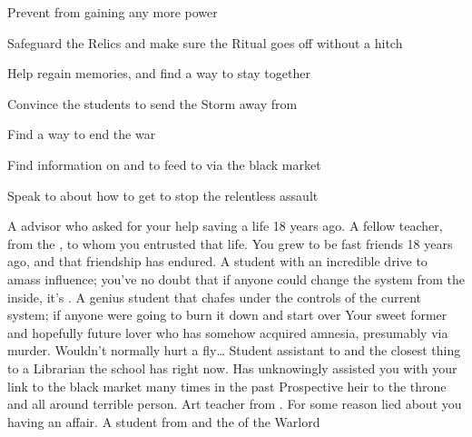 \documentclass[char]{GL2020}
\begin{document}
\begin{itemz}[Goals]
	\item Prevent \cPrince{} from gaining any more power
	\item Safeguard the Relics and make sure the Ritual goes off without a hitch
	\item Help \cLibrarian{} regain \cLibrarian{\their} memories, and find a way to stay together
	\item Convince the students to send the Storm away from \pShip{}
\item Find a way to end the war
	\item Find information on \pFarm{} and \pTech{} to feed to \pShip{} via the black market
	\item Speak to \cWarlordDaughter{} about how to get \cLoud{} to stop the relentless assault
\end{itemz}

\begin{itemz}[Notes]
	\item 
\end{itemz}

\begin{contacts}
	\contact{\cEvil{}} A \pFarm{} advisor who asked for your help saving a life 18 years ago.
\contact{\cPirate{}} A fellow teacher, from the \pShip{}, to whom you entrusted that life. You grew to be fast friends 18 years ago, and that friendship has endured.
\contact{\cAmbition{}} A \pTech{} student with an incredible drive to amass influence; you’ve no doubt that if anyone could change the system from the inside, it’s \cAmbition{}.
\contact{\cTechStar{}} A genius \pTech{} student that chafes under the controls of the current system; if anyone were going to burn it down and start over
	\contact{\cLibrarian{}} Your sweet former and hopefully future lover who has somehow acquired amnesia, presumably via murder. Wouldn’t normally hurt a fly\ldots
	\contact{\cLibAssist{}} Student assistant to \cLibrarian{} and the closest thing to a Librarian the school has right now. Has unknowingly assisted you with your link to the black market many times in the past
\contact{\cPrince{}} Prospective heir to the \pFarm{} throne and all around terrible person.
	\contact{\cChupAvenger{}} Art teacher from \pShip{}. For some reason lied about you having an affair.
	\contact{\cWarlordDaughter{}} A student from \pShip{} and the \cWarlordDaughter{\child} of the Warlord

\end{contacts}
\end{document}
